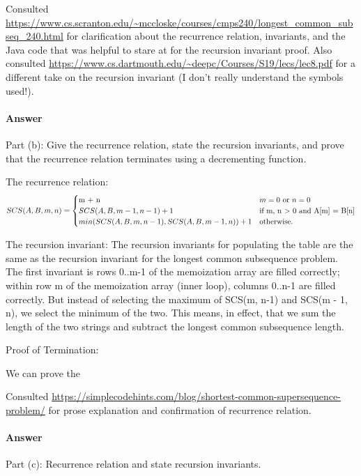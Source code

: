 \documentclass{article}
\begin{document}
Consulted \url{https://www.cs.scranton.edu/~mccloske/courses/cmps240/longest_common_subseq_240.html} for clarification about the recurrence relation, invariants, and the Java code that was helpful to stare at for the recursion invariant proof. Also consulted \url{https://www.cs.dartmouth.edu/~deepc/Courses/S19/lecs/lec8.pdf} for a different take on the recursion invariant (I don't really understand the symbols used!). 

\paragraph{Answer}{Part (b): Give the recurrence relation, state the recursion invariants, and prove that the recurrence relation terminates using a decrementing function.}

The recurrence relation: 
\begin{equation}
SCS(A, B, m, n) = 
\begin{cases}
   $m + n$ & \text{$m = 0$ or $n = 0$}\\
    SCS(A, B, m-1, n-1) + 1 & \text{if m, n $>$ 0 and A[m] = B[n]}\\
    min(SCS(A, B, m, n - 1), SCS(A, B, m - 1, n))+ 1 & \text{otherwise}.
  \end{cases}
\end{equation}

The recursion invariant: The recursion invariants for populating the table are the same as the recursion invariant for the longest common subsequence problem. The first invariant is rows 0..m-1 of the memoization array are filled correctly; within row m of the memoization array (inner loop), columns 0..n-1 are filled correctly. But instead of selecting the maximum of SCS(m, n-1) and SCS(m - 1, n), we select the minimum of the two. This means, in effect, that we sum the length of the two strings and subtract the longest common subsequence length. 

Proof of Termination: \todo{}

We can prove the 

Consulted \url{https://simplecodehints.com/blog/shortest-common-supersequence-problem/} for prose explanation and confirmation of recurrence relation. 

\paragraph{Answer}{Part (c): Recurrence relation and state recursion invariants.}
\end{document}
